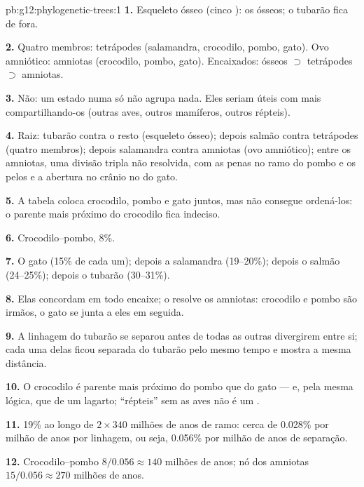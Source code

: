 \begin{solution}{pb:g12:phylogenetic-trees:1}
\textbf{1.} Esqueleto ósseo (cinco ): os  ósseos; o
tubarão fica de fora.

\textbf{2.} Quatro membros: tetrápodes (salamandra, crocodilo, pombo,
gato). Ovo amniótico: amniotas (crocodilo, pombo, gato). Encaixados:
 ósseos $\supset$ tetrápodes $\supset$ amniotas.

\textbf{3.} Não: um estado numa  só não agrupa nada. Eles seriam
úteis com mais  compartilhando-os (outras aves, outros
mamíferos, outros répteis).

\textbf{4.} Raiz: tubarão contra o resto (esqueleto ósseo); depois
salmão contra tetrápodes (quatro membros); depois salamandra contra
amniotas (ovo amniótico); entre os amniotas, uma divisão tripla não
resolvida, com as penas no ramo do pombo e os pelos e a abertura no
crânio no do gato.

\textbf{5.} A tabela coloca crocodilo, pombo e gato juntos, mas não
consegue ordená-los: o parente mais próximo do crocodilo fica indeciso.

\textbf{6.} Crocodilo--pombo, 8\%.

\textbf{7.} O gato (15\% de cada um); depois a salamandra (19--20\%);
depois o salmão (24--25\%); depois o tubarão (30--31\%).

\textbf{8.} Elas concordam em todo encaixe; o  resolve os amniotas:
crocodilo e pombo são irmãos, o gato se junta a eles em seguida.

\textbf{9.} A linhagem do tubarão se separou antes de todas as outras
divergirem entre si; cada uma delas ficou separada do tubarão pelo
mesmo tempo e mostra a mesma distância.

\textbf{10.} O crocodilo é parente mais próximo do pombo que do gato
--- e, pela mesma lógica, que de um lagarto; ``répteis'' sem as aves
não é um .

\textbf{11.} 19\% ao longo de $2 \times 340$ milhões de anos de ramo:
cerca de 0.028\% por milhão de anos por linhagem, ou seja, 0.056\% por
milhão de anos de separação.

\textbf{12.} Crocodilo--pombo $8/0.056 \approx 140$ milhões de anos; nó
dos amniotas $15/0.056 \approx 270$ milhões de anos.


\end{solution}
